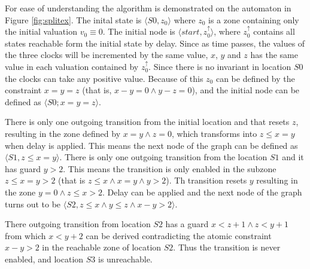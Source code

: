 \begin{example}


For ease of understanding the algorithm is demonstrated on the automaton in Figure \ref{fig:splitex}. The inital state is  $\langle S0, z_0 \rangle$ where $z_0$ is a zone containing only the initial valuation $v_0 \equiv 0$. The initial node is  $\langle start, z_0^\uparrow  \rangle$, where $z_0^\uparrow$ contains all states reachable form the initial state by delay. Since as time passes, the values of the three clocks will be incremented by the same value, $x$, $y$ and $z$ has the same value in each valuation contained by $z_0^\uparrow$. Since there is no invariant in location $S0$ the clocks can take any positive value. Because of this $z_0$ can be defined by the constraint $x=y=z$ (that is, $x-y = 0 \wedge y-z=0 $), and the initial node can be defined as $\langle S0; x=y=z  \rangle$.

There is only one outgoing transition from the initial location and that resets $z$, resulting in the zone defined by $x=y \wedge z=0$, which transforms into $z \leq x=y$ when delay is applied. This means the next node of the graph can be defined as $\langle S1, z \leq x=y \rangle$. There is only one outgoing transition from the location $S1$ and it has guard $y>2$. This means the transition is only enabled in the subzone $z \leq x=y>2$ (that is $z \leq x \wedge x=y \wedge y>2$). Th transition resets $y$ resulting in the zone $y=0 \wedge z \leq x > 2$. Delay can be applied and the next node of the graph turns out to be $\langle S2, z \leq x \wedge y \leq z \wedge x-y>2 \rangle$.

There outgoing transition from location $S2$ has a guard $x<z+1 \wedge z<y+1$ from which $x<y+2$ can be derived contradicting the atomic constraint $x-y>2$ in the reachable zone of location $S2$. Thus the transition is never enabled, and location $S3$ is unreachable.  

\end{example}

